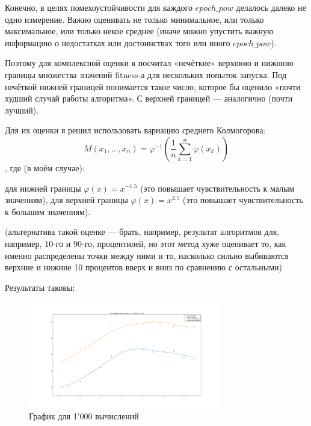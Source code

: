 \documentclass[11pt]{article}
\begin{document}
    Конечно, в целях помехоустойчивости для каждого $epoch\_pow$ делалось далеко не одно измерение.
    Важно оценивать не только минимальное, или только максимальное, или только некое среднее (иначе можно упустить важную информацию
    о недостатках или достоинствах того или иного $epoch\_pow$).

    Поэтому для комплексной оценки я посчитал «нечёткие» верхнюю и нижнюю границы множества значений fitness-а для нескольких попыток запуска.
    Под нечёткой нижней границей понимается такое число, которое бы оценило «почти худший случай работы алгоритма».
    С верхней границей — аналогично (почти лучший).

    Для их оценки я решил использовать вариацию среднего Колмогорова:
    \begin{equation}
        M(x_{1},\ldots ,x_{n})=\varphi ^{-1}\left({\frac {1}{n}}\sum _{k=1}^{n}\varphi (x_{k})\right)
    \end{equation}
    , где (в моём случае):

    для нижней границы $\varphi(x) = x^{-1.5}$ (это повышает чувствительность к малым значениям),
    для верхней границы $\varphi(x) = x^{2.5}$ (это повышает чувствительность к большим значениям).

    (альтернатива такой оценке — брать, например, результат алгоритмов для, например, 10-го и 90-го, процентилей,
    но этот метод хуже оценивает то, как именно распределены точки между ними и то,
    насколько сильно выбиваются верхние и нижние 10 процентов вверх и вниз по сравнению с остальными)

    Результаты таковы:
    \begin{figure}[h]
        \centering
        \includegraphics[width=0.75\textwidth]{exploring_optimal_epoch_pow_1000_iterations.png}
        \caption{График для 1'000 вычислений}
        \label{fig:epoch-pow-1000}
    \end{figure}
    \FloatBarrier
\end{document}
